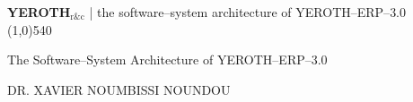 \documentclass[a4paper, 12pt]{report}
\newcommand{\yerothrc}{\textcolor{yerothColorGreen}
			{\textsc{\textcolor{yerothColorRed}{YEROTH}}$_{\text{r\&c}}$\xspace}}
\newcommand{\yerotherpblack}{YEROTH--ERP--$3.0$\xspace}
\newcommand{\myfullacademicname}{DR. XAVIER NOUMBISSI NOUNDOU\xspace}
\begin{document}
\thispagestyle{OnlyFirstPage}

{\bf \Large \yerothrc} {| \sc \scriptsize the software--system architecture of \yerotherpblack}
\\ \line(1,0){540}

\vspace{2.0em}

\begin{center}
{\LARGE The Software--System Architecture of \yerotherpblack}
\end{center}

\vspace{2.0em}

\begin{center}
{\large \myfullacademicname}
\end{center}

\vspace{4.0em}



\begingroup
\tableofcontents
\endgroup

\begingroup
\color{medgreen}
\listoffigures
\endgroup

\begingroup
\color{medgreen}
\listoftables
\endgroup

\cleardoublepage







\cleardoublepage



\cleardoublepage
{}
{}
\appendix


\cleardoublepage
{}
\printindex
\end{document}

